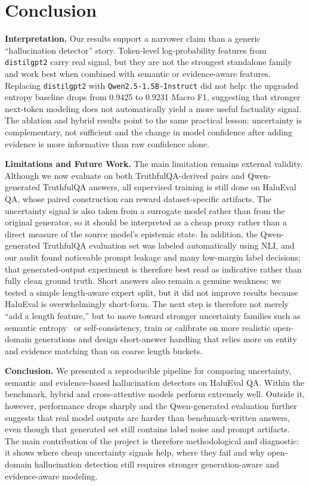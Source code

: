 \documentclass[conference]{IEEEtran}
\begin{document}
\section{Conclusion}
\label{sec:conclusion}
\raggedbottom

\textbf{Interpretation.} Our results support a narrower claim than a generic
``hallucination detector'' story. Token-level log-probability features from
\texttt{distilgpt2} carry real signal, but they are not the strongest standalone
family and work best when combined with semantic or evidence-aware features.
Replacing \texttt{distilgpt2} with \texttt{Qwen2.5-1.5B-Instruct} did not help:
the upgraded entropy baseline drops from 0.9425 to 0.9231 Macro F1, suggesting
that stronger next-token modeling does not automatically yield a more useful
factuality signal. The ablation and hybrid results point to the same practical
lesson: uncertainty is complementary, not sufficient and the change in model
confidence after adding evidence is more informative than raw confidence alone.

\textbf{Limitations and Future Work.} The main limitation remains external
validity. Although we now evaluate on both TruthfulQA-derived pairs and
Qwen-generated TruthfulQA answers, all supervised training is still done on
HaluEval QA, whose paired construction can reward dataset-specific artifacts.
The uncertainty signal is also taken from a surrogate model rather than from
the original generator, so it should be interpreted as a cheap proxy rather
than a direct measure of the source model's epistemic state. In addition, the
Qwen-generated TruthfulQA evaluation set was labeled automatically using NLI,
and our audit found noticeable prompt leakage and many low-margin label
decisions; that generated-output experiment is therefore best read as
indicative rather than fully clean ground truth. Short answers also remain a
genuine weakness: we tested a simple length-aware expert split, but it did not
improve results because HaluEval is overwhelmingly short-form. The next step is
therefore not merely ``add a length feature,'' but to move toward stronger
uncertainty families such as semantic entropy~\cite{kuhn2023semantic} or
self-consistency, train or calibrate on more realistic open-domain
generations and design short-answer handling that relies more on entity and
evidence matching than on coarse length buckets.

\textbf{Conclusion.} We presented a reproducible pipeline for comparing
uncertainty, semantic and evidence-based hallucination detectors on HaluEval
QA. Within the benchmark, hybrid and cross-attentive models perform extremely
well. Outside it, however, performance drops sharply and the Qwen-generated
evaluation further suggests that real model outputs are harder than
benchmark-written answers, even though that generated set still contains label
noise and prompt artifacts. The main contribution of the project is therefore
methodological and diagnostic: it shows where cheap uncertainty signals help,
where they fail and why open-domain hallucination detection still requires
stronger generation-aware and evidence-aware modeling.
\end{document}
